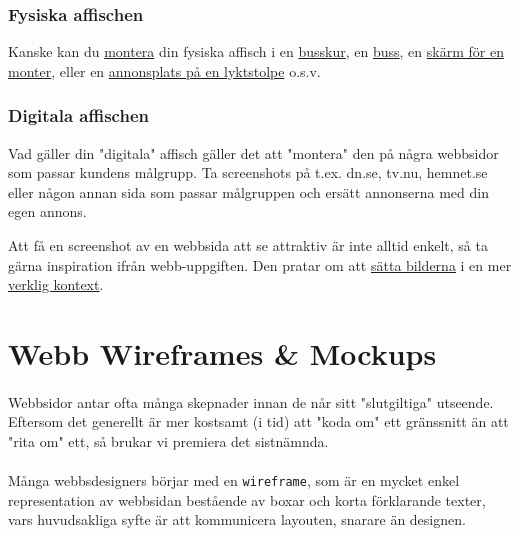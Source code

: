 \documentclass{article}
\begin{document}
      \subsubsection*{ Fysiska affischen }
        Kanske kan du
        \href{http://www.teamtejbrant.se/upload/images/Produkter/vadertskydd.jpg}{montera}
        din fysiska affisch i en
        \href{http://toobigtofitinhere.com/wordpress/wp-content/uploads/2010/05/IMG_1087.jpg}{busskur},
        en 
        \href{https://www.google.se/search?q=buss+uppsala&um=1&ie=UTF-8&hl=sv&tbm=isch&source=og&sa=N&tab=wi&ei=da8sUsrOFKGN7QbtnYGgDg&biw=1680&bih=929&sei=d68sUuidE4PZ4ASP_4DIBQ}{buss},
        en
        \href{http://www.laurisha.com/wp-content/uploads/2013/04/GradShow-BannerMockup.png}{skärm för en monter},
        eller en
        \href{http://www.martinholm.com/wp-content/uploads/banner_mockup.jpg}{annonsplats på en lyktstolpe}
        o.s.v.

    \subsubsection*{ Digitala affischen }
      Vad gäller din "digitala" affisch gäller det att "montera" den på några webbsidor som passar kundens målgrupp. Ta screenshots på t.ex. dn.se, tv.nu, hemnet.se eller någon annan sida som passar målgruppen och ersätt annonserna med din egen annons.

      Att få en screenshot av en webbsida att se attraktiv är inte alltid enkelt, så ta gärna inspiration ifrån webb-uppgiften. Den pratar om att
      \href{http://dribbble.com/shots/1226243-Wp-Theme-Experiment?list=popular&offset=1}{sätta bilderna}
      i en mer
      \href{http://dribbble.com/shots/1226541-New-site-up?list=popular&offset=15}{verklig kontext}.

  \newpage
  \section{Webb Wireframes \& Mockups}
    \paragraph{}
    Webbsidor antar ofta många skepnader innan de når sitt "slutgiltiga" utseende. Eftersom det generellt är mer kostsamt (i tid) att "koda om" ett gränssnitt än att "rita om" ett, så brukar vi premiera det sistnämnda.

    \paragraph{}
    Många webbsdesigners börjar med en \texttt{wireframe}, som är en mycket enkel representation av webbsidan bestående av boxar och korta förklarande texter, vars huvudsakliga syfte är att kommunicera layouten, snarare än designen. 
\end{document}

